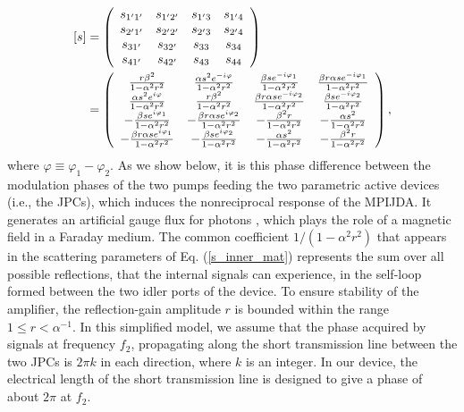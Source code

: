 \documentclass[aip,onecolumn,10pt]{revtex4}%
\begin{document}
\begin{align}
\left[  s\right]    & =\left(
\begin{array}
[c]{cccc}%
s_{1^{\prime}1^{\prime}} & s_{1^{\prime}2^{\prime}} & s_{1^{\prime}3} &
s_{1^{\prime}4}\\
s_{2^{\prime}1^{\prime}} & s_{2^{\prime}2^{\prime}} & s_{2^{\prime}3} &
s_{2^{\prime}4}\\
s_{31^{\prime}} & s_{32^{\prime}} & s_{33} & s_{34}\\
s_{41^{\prime}} & s_{42^{\prime}} & s_{43} & s_{44}%
\end{array}
\right)  \nonumber\\
& =\left(
\begin{array}
[c]{cccc}%
\frac{r\beta^{2}}{1-\alpha^{2}r^{2}} & \frac{\alpha s^{2}e^{-i\varphi}%
}{1-\alpha^{2}r^{2}} & \frac{\beta se^{-i\varphi_{1}}}{1-\alpha^{2}r^{2}} &
\frac{\beta r\alpha se^{-i\varphi_{1}}}{1-\alpha^{2}r^{2}}\\
\frac{\alpha s^{2}e^{i\varphi}}{1-\alpha^{2}r^{2}} & \frac{r\beta^{2}%
}{1-\alpha^{2}r^{2}} & \frac{\beta r\alpha se^{-i\varphi_{2}}}{1-\alpha
	^{2}r^{2}} & \frac{\beta se^{-i\varphi_{2}}}{1-\alpha^{2}r^{2}}\\
-\frac{\beta se^{i\varphi_{1}}}{1-\alpha^{2}r^{2}} & -\frac{\beta r\alpha
	se^{i\varphi_{2}}}{1-\alpha^{2}r^{2}} & -\frac{\beta^{2}r}{1-\alpha^{2}r^{2}}
& -\frac{\alpha s^{2}}{1-\alpha^{2}r^{2}}\\
-\frac{\beta r\alpha se^{i\varphi_{1}}}{1-\alpha^{2}r^{2}} & -\frac{\beta
	se^{i\varphi_{2}}}{1-\alpha^{2}r^{2}} & -\frac{\alpha s^{2}}{1-\alpha^{2}r^{2}}
& -\frac{\beta^{2}r}{1-\alpha^{2}r^{2}}%
\end{array}
\right),\label{s_inner_mat}%
\end{align}
where $\varphi\equiv\varphi_{1}-\varphi_{2}$. As we show below, it is this phase difference between the modulation phases of the two pumps feeding the two parametric active devices (i.e., the JPCs), which induces the nonreciprocal response of the MPIJDA. It generates an artificial gauge flux for photons \cite{NoiselessCirc,AhranovBohmPhotonic,AhranovBohmMixers,gyrator,DircJPC}, which plays the role of a magnetic field in a Faraday medium. The common coefficient $1/(1-\alpha^{2}r^{2})$ that appears in the scattering parameters of Eq. (\ref{s_inner_mat}) represents the sum over all possible reflections, that the internal signals can experience, in the self-loop formed between the two idler ports of the device. To ensure stability of the amplifier, the reflection-gain amplitude $r$ is bounded within the range $1\leq r<\alpha^{-1}$. In this simplified model, we assume that the phase acquired by signals at frequency $f_2$, propagating along the short transmission line between the two JPCs is $2\pi k$ in each direction, where $k$ is an integer. In our device, the electrical length of the short transmission line is designed to give a phase of about $2\pi$ at $f_2$.  
\end{document}
